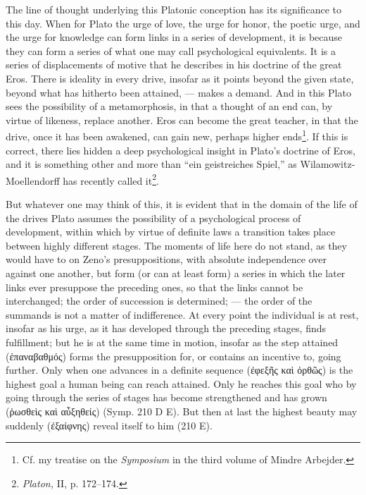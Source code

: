 \documentclass[12pt,a4paper,openany]{book}
\newcommand{\opage}[1]{\marginnote{\footnotesize\textit{[#1]}}}
\begin{document}
The line of thought underlying this Platonic
conception has its significance to this day.  When
for Plato the urge of love, the urge for honor, the poetic urge, and
the urge for knowledge can form links in a series of development, it
is because they can form a series of what one may
call psychological equivalents.  It is a series of
displacements of motive that he describes in his doctrine of the great
Eros.  There is ideality in every drive, insofar as it points
beyond the given state, beyond what has hitherto been
attained, --- makes a demand.  And in this Plato sees the possibility
of a metamorphosis, in that a thought of an end can, by virtue of
likeness, replace another.  Eros can become the great
teacher, in that the drive, once it has been awakened, can
gain new, perhaps higher ends\footnote[1]{Cf. my treatise on the \textit{Symposium} in the third volume of Mindre Arbejder.}.  If this is correct,
there lies hidden a deep psychological insight in Plato's doctrine
of Eros, and it is something other and more than ``ein geistreiches
Spiel,'' as Wilamowitz-Moellendorff has recently called it\footnote[2]{\textit{Platon,} II, p. 172--174.}.

But whatever one may think of this, it is evident
that in the domain of the life of the drives Plato assumes the possibility
of a psychological process of development, within which
by virtue of definite laws a transition takes place between highly
different stages.  The moments of life here do not stand, as
they would have to on Zeno's presuppositions, with absolute independence
over against one another, but form (or can at least
form) a series in which the later links ever
\setcounter{footnote}{0}%
\opage{46}presuppose the preceding ones, so that the links cannot be interchanged;
the order of succession is determined; --- the order of the summands is
not a matter of indifference.  At every point the individual is at rest,
insofar as his urge, as it has developed
through the preceding stages, finds fulfillment;
but he is at the same time in motion, insofar as the step attained
(ἐπαναβαθμός) forms the presupposition for, or contains an
incentive to, going further.  Only when one advances
in a definite sequence (ἐφεξῆς καὶ ὀρθῶς) is
the highest goal a human being can reach attained.  Only he reaches
this goal who by going through the series of stages has
become strengthened and has grown (ῥωσθεὶς καὶ αὖξηθείς) (Symp.
210 D E).  But then at last the highest beauty may suddenly
(ἐξαίφνης) reveal itself to him (210 E).
\end{document}

